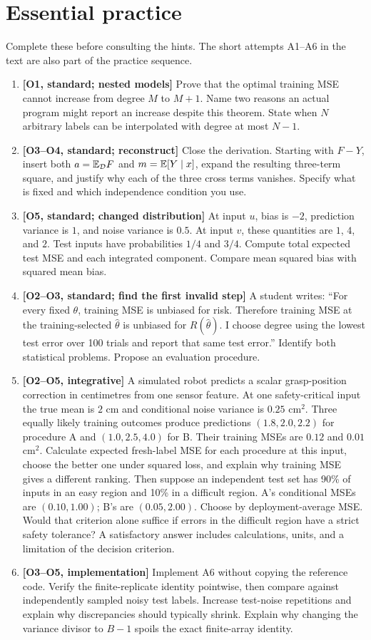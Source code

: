 \section*{Essential practice}
Complete these before consulting the hints. The short attempts A1--A6 in the text are also part of the practice sequence.
\begin{enumerate}[label=E\arabic*.,leftmargin=*]
\item \textbf{[O1, standard; nested models]} Prove that the optimal training MSE cannot increase from degree $M$ to $M+1$. Name two reasons an actual program might report an increase despite this theorem. State when $N$ arbitrary labels can be interpolated with degree at most $N-1$.
\item \textbf{[O3--O4, standard; reconstruct]} Close the derivation. Starting with $F-Y$, insert both $a=\mathbb{E}_{\mathcal D}F$ and $m=\mathbb{E}[Y\mid x]$, expand the resulting three-term square, and justify why each of the three cross terms vanishes. Specify what is fixed and which independence condition you use.
\item \textbf{[O5, standard; changed distribution]} At input $u$, bias is $-2$, prediction variance is $1$, and noise variance is $0.5$. At input $v$, these quantities are $1$, $4$, and $2$. Test inputs have probabilities $1/4$ and $3/4$. Compute total expected test MSE and each integrated component. Compare mean squared bias with squared mean bias.
\item \textbf{[O2--O3, standard; find the first invalid step]} A student writes: ``For every fixed $\theta$, training MSE is unbiased for risk. Therefore training MSE at the training-selected $\hat\theta$ is unbiased for $R(\hat\theta)$. I choose degree using the lowest test error over 100 trials and report that same test error.'' Identify both statistical problems. Propose an evaluation procedure.
\item \textbf{[O2--O5, integrative]} A simulated robot predicts a scalar grasp-position correction in centimetres from one sensor feature. At one safety-critical input the true mean is $2$ cm and conditional noise variance is $0.25$ cm$^2$. Three equally likely training outcomes produce predictions $(1.8,2.0,2.2)$ for procedure A and $(1.0,2.5,4.0)$ for B. Their training MSEs are $0.12$ and $0.01$ cm$^2$. Calculate expected fresh-label MSE for each procedure at this input, choose the better one under squared loss, and explain why training MSE gives a different ranking. Then suppose an independent test set has 90\% of inputs in an easy region and 10\% in a difficult region. A's conditional MSEs are $(0.10,1.00)$; B's are $(0.05,2.00)$. Choose by deployment-average MSE. Would that criterion alone suffice if errors in the difficult region have a strict safety tolerance? A satisfactory answer includes calculations, units, and a limitation of the decision criterion.
\item \textbf{[O3--O5, implementation]} Implement A6 without copying the reference code. Verify the finite-replicate identity pointwise, then compare against independently sampled noisy test labels. Increase test-noise repetitions and explain why discrepancies should typically shrink. Explain why changing the variance divisor to $B-1$ spoils the exact finite-array identity.
\end{enumerate}
